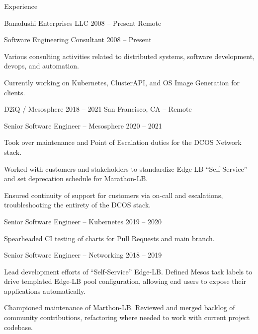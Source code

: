 \documentclass{resume}
\begin{document}
\begin{rSection}{Experience}
        \begin{rSubsection}{Banadushi Enterprises LLC}
            {2008 -- Present} %
            {Remote} %
            \begin{rSubsubsection}{Software Engineering Consultant} %
                {2008 -- Present} %
                {\small
            \item Various consulting activities related to distributed
                systems, software development, devops, and automation.
            \item Currently working on Kubernetes, ClusterAPI, and OS Image
                Generation for clients.
                }
            \end{rSubsubsection}
        \end{rSubsection}
        \begin{rSubsection}{D2iQ / Mesosphere}
            {2018 -- 2021} %
            {San Francisco, CA -- Remote} %
            \begin{rSubsubsection}{Senior Software Engineer -- Mesosphere} %
                {2020 -- 2021} %
                {\small
            \item Took over maintenance and Point of Escalation duties for the DCOS
                Network stack.
            \item Worked with customers and stakeholders to standardize Edge-LB
                ``Self-Service'' and set deprecation schedule for Marathon-LB\@.
            \item Ensured continuity of support for customers via on-call and
                escalations, troubleshooting the entirety of the DCOS stack.
                }
            \end{rSubsubsection}
            \begin{rSubsubsection}{Senior Software Engineer -- Kubernetes} %
                {2019 -- 2020} %
                {\small
            \item Spearheaded CI testing of charts for Pull Requests and main branch.
                }
            \end{rSubsubsection}
            \begin{rSubsubsection}{Senior Software Engineer -- Networking} %
                {2018 -- 2019} %
                {\small
            \item Lead development efforts of ``Self-Service'' Edge-LB\@. Defined Mesos
                task labels to drive templated Edge-LB pool configuration, allowing
                end users to expose their applications automatically.
            \item Championed maintenance of Marthon-LB\@. Reviewed and merged backlog of
                community contributions, refactoring where needed to work with current
                project codebase.
                }
            \end{rSubsubsection}
        \end{rSubsection}


\end{rSection}
\end{document}
